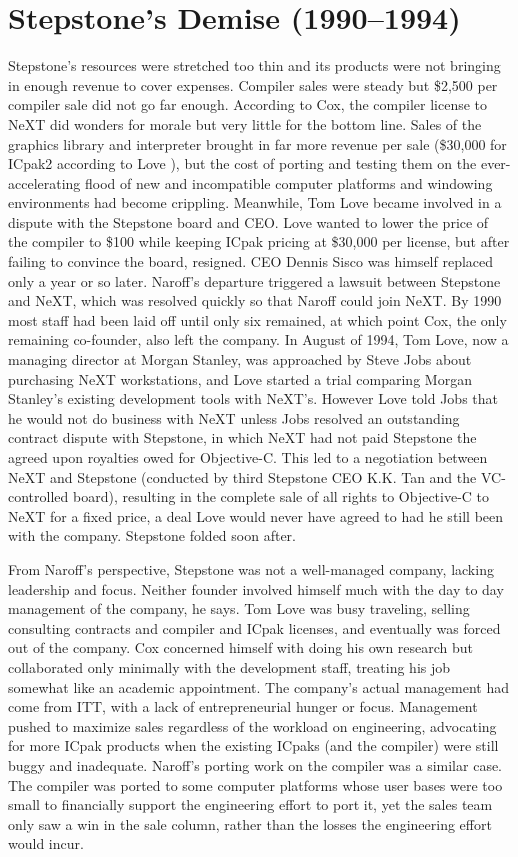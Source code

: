 \documentclass[acmsmall]{acmart}\settopmatter{}
\begin{document}
\section{Stepstone's Demise (1990--1994)}
\label{sec-stepstones_demise1990-1994}
Stepstone's resources were stretched too thin and its products were not bringing in enough revenue to cover expenses. Compiler sales were steady but \$2,500 per compiler sale did not go far enough. According to Cox, the compiler license to NeXT did wonders for morale but very little for the bottom line. Sales of the graphics library and interpreter brought in far more revenue per sale (\$30,000 for ICpak2 according to Love \citetext{\citeyear{love_skype_2019}}), but the cost of porting and testing them on the ever-accelerating flood of new and incompatible computer platforms and windowing environments had become crippling. Meanwhile, Tom Love became involved in a dispute with the Stepstone board and CEO. Love wanted to lower the price of the compiler to \$100 while keeping ICpak pricing at \$30,000 per license, but after failing to convince the board, resigned. CEO Dennis Sisco was himself replaced only a year or so later. Naroff's departure triggered a lawsuit between Stepstone and NeXT, which was resolved quickly so that Naroff could join NeXT. By 1990 most staff had been laid off until only six remained, at which point Cox, the only remaining co-founder, also left the company. In August of 1994, Tom Love, now a managing director at Morgan Stanley, was approached by Steve Jobs about purchasing NeXT workstations, and Love started a trial comparing Morgan Stanley's existing development tools with NeXT's. However Love told Jobs that he would not do business with NeXT unless Jobs resolved an outstanding contract dispute with Stepstone, in which NeXT had not paid Stepstone the agreed upon royalties owed for Objective-C. This led to a negotiation between NeXT and Stepstone (conducted by third Stepstone CEO K.K. Tan and the VC-controlled board), resulting in the complete sale of all rights to Objective-C to NeXT for a fixed price, a deal Love would never have agreed to had he still been with the company. Stepstone folded soon after.

From Naroff's perspective, Stepstone was not a well-managed company, lacking leadership and focus. Neither founder involved himself much with the day to day management of the company, he says. Tom Love was busy traveling, selling consulting contracts and compiler and ICpak licenses, and eventually was forced out of the company. Cox concerned himself with doing his own research but collaborated only minimally with the development staff, treating his job somewhat like an academic appointment. The company's actual management had come from ITT, with a lack of entrepreneurial hunger or focus. Management pushed to maximize sales regardless of the workload on engineering, advocating for more ICpak products when the existing ICpaks (and the compiler) were still buggy and inadequate. Naroff's porting work on the compiler was a similar case. The compiler was ported to some computer platforms whose user bases were too small to financially support the engineering effort to port it, yet the sales team only saw a win in the sale column, rather than the losses the engineering effort would incur. 
\end{document}
